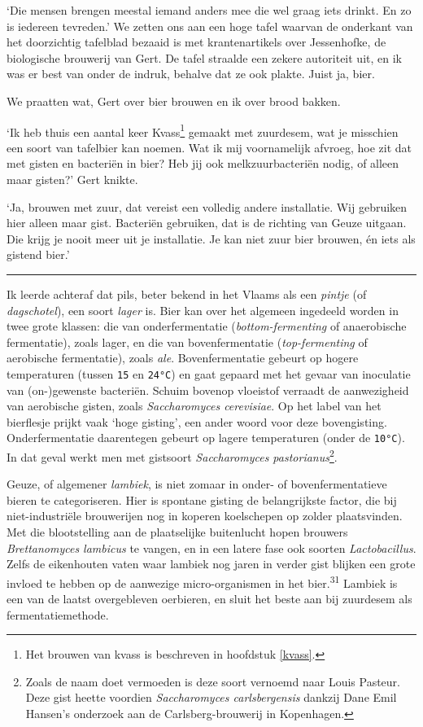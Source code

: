 \documentclass[
  11pt,
  dutch,
]{memoir}
\begin{document}
`Die mensen brengen meestal iemand anders mee die wel graag iets drinkt.
En zo is iedereen tevreden.' We zetten ons aan een hoge tafel waarvan de
onderkant van het doorzichtig tafelblad bezaaid is met krantenartikels
over Jessenhofke, de biologische brouwerij van Gert. De tafel straalde
een zekere autoriteit uit, en ik was er best van onder de indruk,
behalve dat ze ook plakte. Juist ja, bier.

We praatten wat, Gert over bier brouwen en ik over brood bakken.

`Ik heb thuis een aantal keer Kvass\footnote{Het brouwen van kvass is
  beschreven in hoofdstuk \ref{kvass}.} gemaakt met zuurdesem, wat je
misschien een soort van tafelbier kan noemen. Wat ik mij voornamelijk
afvroeg, hoe zit dat met gisten en bacteriën in bier? Heb jij ook
melkzuurbacteriën nodig, of alleen maar gisten?' Gert knikte.

`Ja, brouwen met zuur, dat vereist een volledig andere installatie. Wij
gebruiken hier alleen maar gist. Bacteriën gebruiken, dat is de richting
van Geuze uitgaan. Die krijg je nooit meer uit je installatie. Je kan
niet zuur bier brouwen, én iets als gistend bier.'

\pfbreak

Ik leerde achteraf dat pils, beter bekend in het Vlaams als een
\emph{pintje} (of \emph{dagschotel}), een soort \emph{lager} is. Bier
kan over het algemeen ingedeeld worden in twee grote klassen: die van
onderfermentatie (\emph{bottom-fermenting} of anaerobische fermentatie),
zoals lager, en die van bovenfermentatie (\emph{top-fermenting} of
aerobische fermentatie), zoals \emph{ale}. Bovenfermentatie gebeurt op
hogere temperaturen (tussen \texttt{15} en \texttt{24°C}) en gaat
gepaard met het gevaar van inoculatie van (on-)gewenste bacteriën.
Schuim bovenop vloeistof verraadt de aanwezigheid van aerobische gisten,
zoals \emph{Saccharomyces cerevisiae}. Op het label van het bierflesje
prijkt vaak `hoge gisting', een ander woord voor deze bovengisting.
Onderfermentatie daarentegen gebeurt op lagere temperaturen (onder de
\texttt{10°C}). In dat geval werkt men met gistsoort \emph{Saccharomyces
pastorianus}\footnote{Zoals de naam doet vermoeden is deze soort
  vernoemd naar Louis Pasteur. Deze gist heette voordien
  \emph{Saccharomyces carlsbergensis} dankzij Dane Emil Hansen's
  onderzoek aan de Carlsberg-brouwerij in Kopenhagen.}.

Geuze, of algemener \emph{lambiek}, is niet zomaar in onder- of
bovenfermentatieve bieren te categoriseren. Hier is spontane gisting de
belangrijkste factor, die bij niet-industriële brouwerijen nog in
koperen koelschepen op zolder plaatsvinden. Met die blootstelling aan de
plaatselijke buitenlucht hopen brouwers \emph{Brettanomyces lambicus} te
vangen, en in een latere fase ook soorten \emph{Lactobacillus}. Zelfs de
eikenhouten vaten waar lambiek nog jaren in verder gist blijken een
grote invloed te hebben op de aanwezige micro-organismen in het
bier.\textsuperscript{31} Lambiek is een van de laatst overgebleven
oerbieren, en sluit het beste aan bij zuurdesem als fermentatiemethode.
\end{document}

